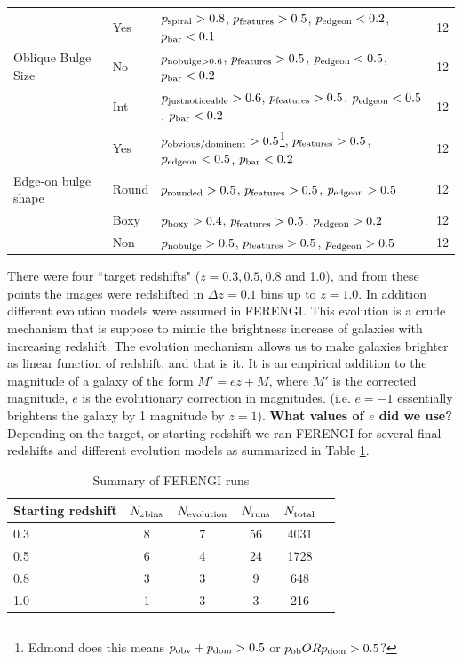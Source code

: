 \documentclass[usenatbib]{mn2e}
\begin{document}
\begin{table}
\begin{tabular}{lllc}
& Yes &  $p_{\rm spiral} > 0.8$, $p_{\rm features} > 0.5$, $p_{\rm edgeon} < 0.2$, $p_{\rm bar} < 0.1$ & 12 \\
Oblique Bulge Size & No & $p_{\rm nobulge>0.6}$, $p_{\rm features} > 0.5$, $p_{\rm edgeon} < 0.5$, $p_{\rm bar} < 0.2$ & 12 \\
& Int &  $p_{\rm justnoticeable}>0.6$, $p_{\rm features} > 0.5$, $p_{\rm edgeon} < 0.5$, $p_{\rm bar} < 0.2$ & 12 \\
& Yes & $p_{\rm obvious/dominent}>0.5$\footnote{Edmond does this means $p_{\rm obv}+p_{\rm dom}>0.5$ or $p_{\rm ob} OR p_{\rm dom} >0.5$? }, $p_{\rm features} > 0.5$, $p_{\rm edgeon} < 0.5$, $p_{\rm bar} < 0.2$ & 12 \\
Edge-on bulge shape 
& Round & $p_{\rm rounded}>0.5$, $p_{\rm features} > 0.5$, $p_{\rm edgeon} > 0.5$ & 12\\
& Boxy & $p_{\rm boxy}>0.4$, $p_{\rm features} > 0.5$, $p_{\rm edgeon} > 0.2$ & 12\\
& Non & $p_{\rm nobulge}>0.5$, $p_{\rm features} > 0.5$, $p_{\rm edgeon} > 0.5$ & 12\\
\hline\hline
\end{tabular}
\end{table}

There were four ``target redshifts" ($z = 0.3, 0.5, 0.8$ and 1.0), and from these points the images were redshifted in $\Delta z = 0.1$ bins up to $z=1.0$. In addition different evolution models were assumed in FERENGI. This evolution is a crude mechanism that is suppose to mimic the brightness increase of galaxies with increasing redshift. The evolution mechanism allows us to make galaxies brighter as linear function of redshift, and that is it. It is an empirical addition to the magnitude of a galaxy of the form $M' = e z + M$, where $M'$ is the corrected magnitude, $e$ is the evolutionary correction in magnitudes.  (i.e. $e=-1$ essentially brightens the galaxy by 1 magnitude by $z=1$). {\bf What values of $e$ did we use?} Depending on the target, or starting redshift we ran FERENGI for several final redshifts and different evolution models as summarized in Table \ref{ferengi}. 

\begin{table}
\caption{Summary of FERENGI runs \label{ferengi}}
\begin{tabular}{lccccc}
\hline\hline
Starting redshift &  $N_{z {\rm bins}}$ & $N_{\rm evolution}$ & $N_{\rm runs}$ & $N_{\rm total}$\\
\hline
0.3 & 8 & 7 & 56 & 4031 \\
0.5 & 6 & 4 & 24 & 1728 \\
0.8 & 3 & 3 & 9 & 648 \\
1.0 & 1 & 3 & 3 & 216 \\
\hline\hline
\end{tabular}
\end{table}
\end{document}
